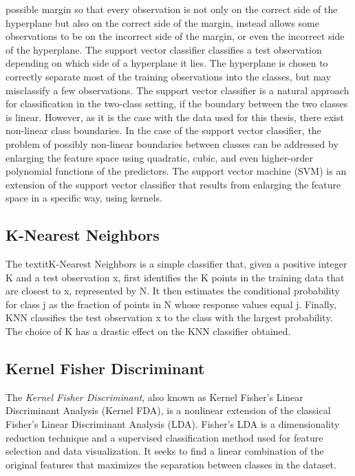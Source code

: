 possible margin so that every observation is not only on the correct side of the hyperplane but also 
on the correct side of the margin, instead allows some observations to be on the incorrect side of the 
margin, or even the incorrect side of the hyperplane.
The support vector classifier classifies a test observation depending on which side of a hyperplane it 
lies. The hyperplane is chosen to correctly separate most of the training observations into the 
classes, but may misclassify a few observations.
The support vector classifier is a natural approach for classification in the two-class setting, if the 
boundary between the two classes is linear. However, as it is the case with the data used for this thesis,
there exist non-linear class boundaries. 
In the case of the support vector classifier, the problem of possibly non-linear boundaries between classes can be 
addressed by enlarging the feature space using quadratic, cubic,  and even higher-order polynomial functions of the predictors.
The support vector machine (SVM) is an extension of the support vector classifier that results from 
enlarging the feature space in a specific way, using kernels.
\subsection{K-Nearest Neighbors}

The textit{K-Nearest Neighbors} is a simple classifier that, given a positive integer K and a test observation x, 
first identifies the K points in the training data that are closest to x, represented by N. It then estimates the conditional 
probability for class j as the fraction of points in N whose response values equal j.
Finally, KNN classifies the test observation x to the class with the largest probability.
The choice of K has a drastic effect on the KNN classifier obtained.
\subsection{Kernel Fisher Discriminant}

The \textit{Kernel Fisher Discriminant}, also known as Kernel Fisher's Linear Discriminant Analysis (Kernel FDA), 
is a nonlinear extension of the classical Fisher's Linear Discriminant Analysis (LDA). 
Fisher's LDA is a dimensionality reduction technique and a supervised classification method used for feature selection 
and data visualization. It seeks to find a linear combination of the original features that maximizes the separation 
between classes in the dataset.

